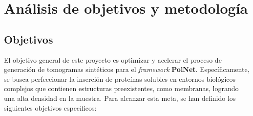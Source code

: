 

\chapter{Análisis de objetivos y metodología}

\section{Objetivos}
El objetivo general de este proyecto es optimizar y acelerar el proceso de generación de tomogramas sintéticos para el \textit{framework} \textbf{PolNet}. Específicamente, se busca perfeccionar la inserción de proteínas solubles en entornos biológicos complejos que contienen estructuras preexistentes, como membranas, logrando una alta densidad en la muestra. Para alcanzar esta meta, se han definido los siguientes objetivos específicos:

